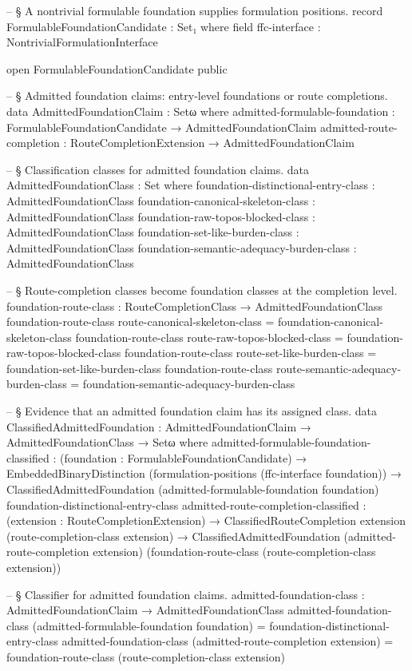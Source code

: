 \documentclass[11pt]{article}
\begin{document}
\begin{code}
-- § A nontrivial formulable foundation supplies formulation positions.
record FormulableFoundationCandidate : Set₁ where
  field
    ffc-interface : NontrivialFormulationInterface

open FormulableFoundationCandidate public

-- § Admitted foundation claims: entry-level foundations or route completions.
data AdmittedFoundationClaim : Setω where
  admitted-formulable-foundation :
    FormulableFoundationCandidate → AdmittedFoundationClaim
  admitted-route-completion :
    RouteCompletionExtension → AdmittedFoundationClaim

-- § Classification classes for admitted foundation claims.
data AdmittedFoundationClass : Set where
  foundation-distinctional-entry-class : AdmittedFoundationClass
  foundation-canonical-skeleton-class  : AdmittedFoundationClass
  foundation-raw-topos-blocked-class   : AdmittedFoundationClass
  foundation-set-like-burden-class     : AdmittedFoundationClass
  foundation-semantic-adequacy-burden-class : AdmittedFoundationClass

-- § Route-completion classes become foundation classes at the completion level.
foundation-route-class : RouteCompletionClass → AdmittedFoundationClass
foundation-route-class route-canonical-skeleton-class =
  foundation-canonical-skeleton-class
foundation-route-class route-raw-topos-blocked-class =
  foundation-raw-topos-blocked-class
foundation-route-class route-set-like-burden-class =
  foundation-set-like-burden-class
foundation-route-class route-semantic-adequacy-burden-class =
  foundation-semantic-adequacy-burden-class

-- § Evidence that an admitted foundation claim has its assigned class.
data ClassifiedAdmittedFoundation :
  AdmittedFoundationClaim → AdmittedFoundationClass → Setω where
  admitted-formulable-foundation-classified :
    (foundation : FormulableFoundationCandidate) →
    EmbeddedBinaryDistinction
      (formulation-positions (ffc-interface foundation)) →
    ClassifiedAdmittedFoundation
      (admitted-formulable-foundation foundation)
      foundation-distinctional-entry-class
  admitted-route-completion-classified :
    (extension : RouteCompletionExtension) →
    ClassifiedRouteCompletion extension (route-completion-class extension) →
    ClassifiedAdmittedFoundation
      (admitted-route-completion extension)
      (foundation-route-class (route-completion-class extension))

-- § Classifier for admitted foundation claims.
admitted-foundation-class :
  AdmittedFoundationClaim → AdmittedFoundationClass
admitted-foundation-class (admitted-formulable-foundation foundation) =
  foundation-distinctional-entry-class
admitted-foundation-class (admitted-route-completion extension) =
  foundation-route-class (route-completion-class extension)


\end{code}
\end{document}
